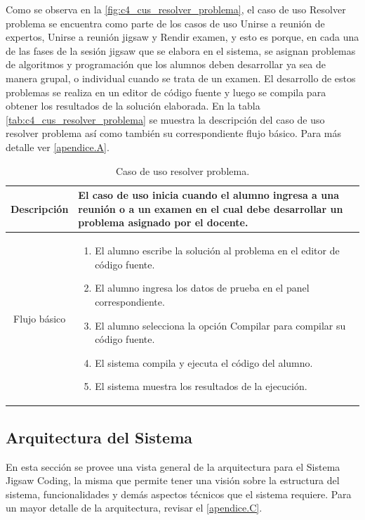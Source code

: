 Como se observa en la \autoref{fig:c4_cus_resolver_problema}, el caso de uso Resolver problema se encuentra como parte de los casos de uso Unirse a reunión de expertos, Unirse a reunión jigsaw y Rendir examen, y esto es porque, en cada una de las fases de la sesión jigsaw que se elabora en el sistema, se asignan problemas de algoritmos y programación que los alumnos deben desarrollar ya sea de manera grupal, o individual cuando se trata de un examen. El desarrollo de estos problemas se realiza en un editor de código fuente y luego se compila para obtener los resultados de la solución elaborada. En la tabla \autoref{tab:c4_cus_resolver_problema} se muestra la descripción del caso de uso resolver problema así como también su correspondiente flujo básico. Para más detalle ver \autoref{apendice.A}.
\clearpage

\begin{longtable}{|c|L{10cm}|}
	\caption{Caso de uso resolver problema.}
	\label{tab:c4_cus_resolver_problema}\\
	\toprule[0.5mm]
	Descripción & El caso de uso inicia cuando el alumno ingresa a una reunión o a un examen en el cual debe desarrollar un problema asignado por el docente. \\  \midrule
	Flujo básico & \begin{enumerate}
		\item El alumno escribe la solución al problema en el editor de código fuente.
		\item El alumno ingresa los datos de prueba en el panel correspondiente.
		\item El alumno selecciona la opción Compilar para compilar su código fuente. 
		\item El sistema compila y ejecuta el código del alumno.
		\item El sistema muestra los resultados de la ejecución.
	\end{enumerate}\\
	\bottomrule[0.5mm]
\end{longtable}




\subsection{Arquitectura del Sistema}
En esta sección se provee una vista general de la arquitectura para el Sistema Jigsaw Coding, la misma que permite tener una visión sobre la estructura del sistema, funcionalidades y demás aspectos técnicos que el sistema requiere. Para un mayor detalle de la arquitectura, revisar el \autoref{apendice.C}.\\

